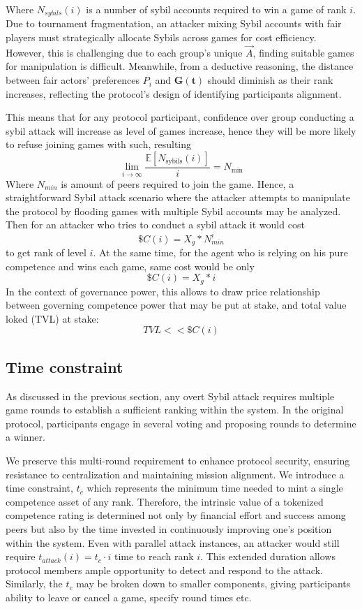 \documentclass{article}
\begin{document}
\begin{CJK}{UTF8}{gbsn}
\begin{multicols}{2}

        Where $N_{sybils}(i)$ is a number of sybil accounts required to win a game of rank $i$. Due to tournament fragmentation, an attacker mixing Sybil accounts with fair players must strategically allocate Sybils across games for cost efficiency. However, this is challenging due to each group's unique $\vec{A}$, finding suitable games for manipulation is difficult.  Meanwhile, from a deductive reasoning, the distance between fair actors' preferences $P_i$ and $\mathbf{G(t)}$ should diminish as their rank increases, reflecting the protocol's design of identifying participants alignment.

        This means that for any protocol participant, confidence over group conducting a sybil attack will increase as level of games increase, hence they will be more likely to refuse joining games with such, resulting $$\lim_{i \to \infty} \frac{\mathbb{E}[N_{\text{sybils}}(i)]}{i} = N_{\text{min}}$$ Where $N_{min}$ is amount of peers required to join the game. Hence, a straightforward Sybil attack scenario where the attacker attempts to manipulate the protocol by flooding games with multiple Sybil accounts may be analyzed.
         Then for an attacker who tries to conduct a sybil attack it would cost
        $$\$C(i) = X_g*N_{min}^i$$ to get rank of level $i$. At the same time, for the agent who is relying on his pure competence and wins each game, same cost would be only $$\$C(i) = X_g*i$$
        In the context of governance power, this allows to draw price relationship between governing competence power that may be put at stake, and total value loked (TVL) at stake: $$TVL << \$C(i)$$

        \subsection{Time constraint}

        As discussed in the previous section, any overt Sybil attack requires multiple game rounds to establish a sufficient ranking within the system. In the original protocol, participants engage in several voting and proposing rounds to determine a winner.

        We preserve this multi-round requirement to enhance protocol security, ensuring resistance to centralization and maintaining mission alignment. We introduce a time constraint,  $t_c$ which represents the minimum time needed to mint a single competence asset of any rank.
        Therefore, the intrinsic value of a tokenized competence rating is determined not only by financial effort and success among peers but also by the time invested in continuously improving one's position within the system. Even with parallel attack instances, an attacker would still require $t_{attack}(i) = t_c \cdot i$ time to reach rank $i$. This extended duration allows protocol members ample opportunity to detect and respond to the attack. Similarly, the $t_c$ may be broken down to smaller components, giving participants ability to leave or cancel a game, specify round times etc.



\end{multicols}
\end{CJK}
\end{document}
